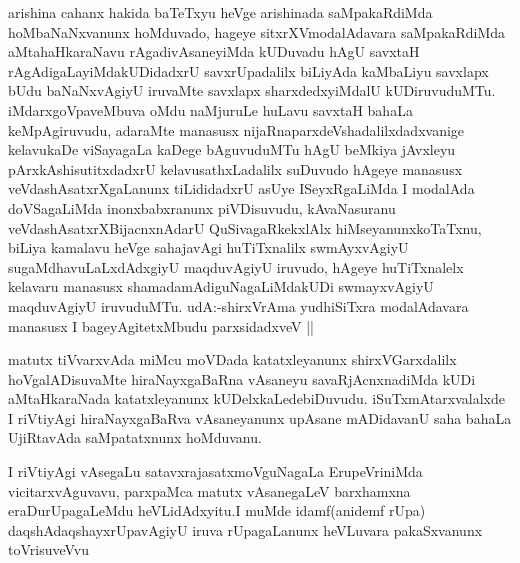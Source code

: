\begin{center}


\end{center}

\begin{artha}
arishina cahanx hakida baTeTxyu heVge arishinada saMpakaRdiMda
hoMbaNaNxvanunx hoMduvado, hageye sitxrXVmodalAdavara saMpakaRdiMda
aMtahaHkaraNavu rAgadivAsaneyiMda kUDuvadu hAgU savxtaH
rAgAdigaLayiMdakUDidadxrU savxrUpadalilx biLiyAda kaMbaLiyu savxlapx
bUdu baNaNxvAgiyU iruvaMte savxlapx sharxdedxyiMdalU
kUDiruvuduMTu. iMdarxgoVpaveMbuva oMdu naMjuruLe huLavu savxtaH bahaLa
keMpAgiruvudu, adaraMte manasusx nijaRnaparxdeVshadalilxdadxvanige
kelavukaDe viSayagaLa kaDege bAguvuduMTu hAgU beMkiya jAvxleyu
pArxkAshisutitxdadxrU kelavusathxLadalilx suDuvudo hAgeye manasusx
veVdashAsatxrXgaLanunx tiLididadxrU asUye ISeyxRgaLiMda I modalAda
doVSagaLiMda inonxbabxranunx piVDisuvudu, kAvaNasuranu
veVdashAsatxrXBijacnxnAdarU QuSivagaRkekxlAlx hiMseyanunxkoTaTxnu,
biLiya kamalavu heVge sahajavAgi huTiTxnalilx swmAyxvAgiyU
sugaMdhavuLaLxdAdxgiyU maqduvAgiyU iruvudo, hAgeye huTiTxnalelx
kelavaru manasusx shamadamAdiguNagaLiMdakUDi swmayxvAgiyU maqduvAgiyU
iruvuduMTu. udA:-shirxVrAma yudhiSiTxra modalAdavara manasusx I
bageyAgitetxMbudu parxsidadxveV ||
\end{artha}

\begin{artha}
matutx tiVvarxvAda miMcu moVDada katatxleyanunx shirxVGarxdalilx
hoVgalADisuvaMte hiraNayxgaBaRna vAsaneyu savaRjAcnxnadiMda kUDi
aMtaHkaraNada katatxleyanunx kUDelxkaLedebiDuvudu. iSuTxmAtarxvalalxde
I riVtiyAgi hiraNayxgaBaRva vAsaneyanunx upAsane mADidavanU saha
bahaLa UjiRtavAda saMpatatxnunx hoMduvanu.
\end{artha}

\begin{artha}
I riVtiyAgi vAsegaLu satavxrajasatxmoVguNagaLa ErupeVriniMda
vicitarxvAguvavu, parxpaMca matutx vAsanegaLeV barxhamxna
eraDurUpagaLeMdu heVLidAdxyitu.I muMde idamf(anidemf rUpa)
daqshAdaqshayxrUpavAgiyU iruva rUpagaLanunx heVLuvara pakaSxvanunx toVrisuveVvu
\end{artha}

\begin{center}


\end{center}

